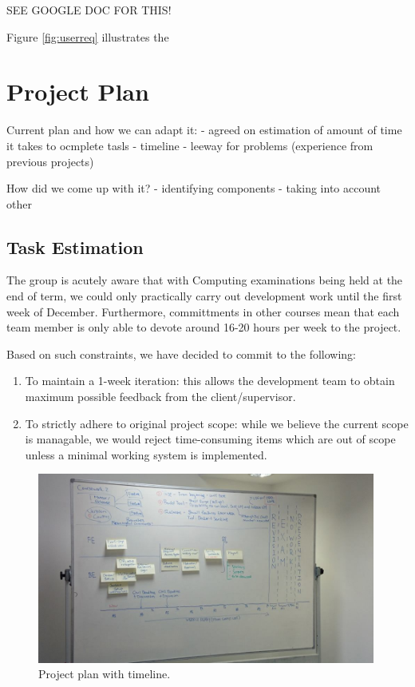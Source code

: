 \documentclass[a4paper]{article}
\begin{document}
SEE GOOGLE DOC FOR THIS!

Figure \ref{fig:userreq} illustrates the 



\section{Project Plan}
Current plan and how we can adapt it:
	- agreed on estimation of amount of time it takes to ocmplete tasls
  - timeline
  - leeway for problems (experience from previous projects)

How did we come up with it? 
	- identifying components
	- taking into account other 

\subsection{Task Estimation}
The group is acutely aware that with Computing examinations being held at the
end of term, we could only practically carry out development work until the
first week of December. Furthermore, committments in other courses mean that 
each team member is only able to devote around 16-20 hours per week to
the project.

Based on such constraints, we have decided to commit to the following:
\begin{enumerate}
  \item To maintain a 1-week iteration: this allows the development team to
        obtain maximum possible feedback from the client/supervisor.
  \item To strictly adhere to original project scope: while we believe the
        current scope is managable, we would reject time-consuming items which
        are out of scope unless a minimal working system is implemented.
\end{enumerate}


\begin{figure}[h]
  \centering
    \includegraphics[width = 0.99\textwidth]{./planning/timeline.jpg}
   
  \caption{Project plan with timeline.}
  \label{fig:timeline}
\end{figure}
\end{document}
